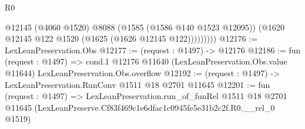 \begin{lexlean}{R0}
\begin{coremodule}
                @12145
                (@4060 @1520)
                @8088
                (@1585 (@1586 @140 @1523 @12095))
                (@1620 @12145 @122 @1520 (@1625 (@1626 @12145 @122)))))))))
@12176 := LexLeanPreservation.Obs
@12177 := (request : @1497) -> @12176
@12186 := fun (request : @1497) =>
  cond.{1} @12176 @11640 (LexLeanPreservation.Obs.value @11644) LexLeanPreservation.Obs.overflow
@12192 := (request : @1497) -> LexLeanPreservation.RunConv @1511 @18 @2701 @11645
@12201 := fun (request : @1497) =>
  LexLeanPreservation.run_of_funRel
    @1511
    @18
    @2701
    @11645
    (LexLeanPreserve.Cf83f469c1e6dfac1c0945fe5e31b2c2f.R0.__rel_0 @1519)
\end{coremodule}
\end{lexlean}
